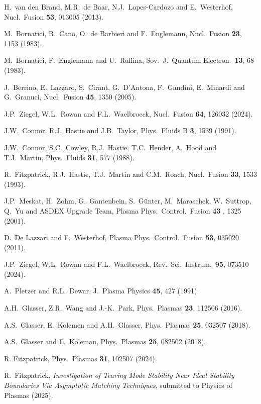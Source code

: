 \documentclass[12pt,prb,aps]{revtex4-1}
\begin{document}
\begin{thebibliography}{99}
 H.~van den Brand, M.R.~de Baar, N.J.~Lopes-Cardozo and E.~Westerhof, Nucl.\ Fusion {\bf 53}, 013005 (2013). 
  
 M.~Bornatici, R.~Cano, O.~de Barbieri and F.~Englemann, Nucl.\ Fusion {\bf 23}, 1153 (1983). 

 M.~Bornatici, F.~Englemann and U.~Ruffina, Sov.\ J.\ Quantum Electron.\ {\bf 13}, 68 (1983).

 J.~Berrino, E.~Lazzaro, S.~Cirant, G.~D'Antona, F.~Gandini, E.~Minardi and G.~Granuci, Nucl.\ Fusion {\bf 45}, 1350 (2005).

 J.P.~Ziegel, W.L.~Rowan and F.L.~Waelbroeck, Nucl.\ Fusion {\bf 64}, 126032 (2024).

 J.W.~Connor, R.J.~Hastie and J.B.~Taylor, Phys.\ Fluids B {\bf 3}, 1539 (1991).

 J.W.~Connor,  S.C.~Cowley, R.J.~Hastie,  T.C.~Hender,  A.~Hood  and T.J.~Martin,  Phys.\ Fluids {\bf 31}, 577 (1988).

 R.~Fitzpatrick, R.J.~Hastie, T.J.~Martin and C.M.~Roach, Nucl.\ Fusion {\bf 33}, 1533 (1993).

 J.P.~Meskat, H.~Zohm, G.~Gantenbein, S.~G\"{u}nter, M.~Maraschek, W.~Suttrop, Q.~Yu and ASDEX Upgrade Team, Plasma Phys.\ Control.\ Fusion {\bf 43} , 1325 (2001).

 D.~De Lazzari and F.~Westerhof, Plasma Phys.\ Control.\ Fusion {\bf 53}, 035020 (2011).

 J.P.~Ziegel, W.L.~Rowan and F.L.~Waelbroeck, Rev.\ Sci.\ Instrum.\ {\bf 95}, 073510 (2024).

 A.~Pletzer and R.L.~Dewar, J.\ Plasma Physics {\bf 45}, 427 (1991).

 A.H.~Glasser, Z.R.~Wang and J.-K.~Park, Phys.\ Plasmas {\bf 23}, 112506 (2016).

 A.S.~Glasser, E.~Kolemen and A.H.~Glasser, Phys.\ Plasmas {\bf 25}, 032507 (2018).

 A.S.~Glasser and E.~Koleman, Phys.\ Plasmas {\bf 25}, 082502 (2018). 

 R. Fitzpatrick, Phys.\ Plasmas {\bf 31}, 102507 (2024).

 R.~Fitzpatrick,  {\em Investigation of  Tearing Mode Stability Near Ideal Stability Boundaries Via Asymptotic Matching Techniques}, submitted
to Physics of Plasmas (2025).


\end{thebibliography}
\end{document}
